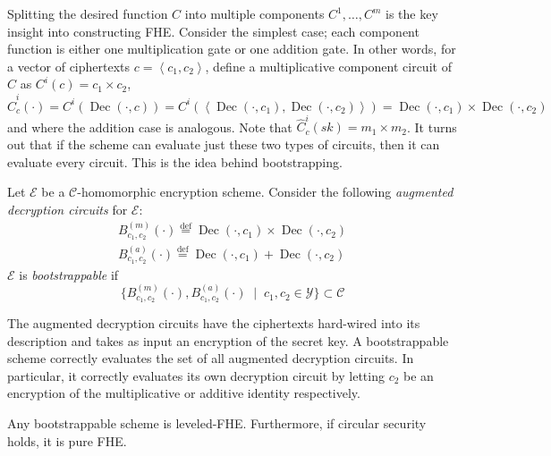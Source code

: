 Splitting the desired function $C$ into multiple components $C^1, \dots, C^m$ is the key insight into constructing FHE. Consider the simplest case; each component function is either one multiplication gate or one addition gate. In other words, for a vector of ciphertexts $c = \left\langle c_1, c_2 \right\rangle$, define a multiplicative component circuit of $C$ as $C^i(c) = c_1 \times c_2$, $\hat{C}^i_c(\cdot) = C^i(\operatorname{Dec}(\cdot, c)) = C^i(\left\langle \operatorname{Dec}(\cdot, c_1), \operatorname{Dec}(\cdot, c_2) \right\rangle) = \operatorname{Dec}(\cdot, c_1) \times \operatorname{Dec}(\cdot, c_2)$ and where the addition case is analogous. Note that $\hat{C}^i_c(sk) = m_1 \times m_2$. It turns out that if the scheme can evaluate just these two types of circuits, then it can evaluate every circuit. This is the idea behind bootstrapping.
\begin{definition}
    Let $\mathcal{E}$ be a $\mathcal{C}$-homomorphic encryption scheme. Consider the following \textit{augmented decryption circuits} for $\mathcal{E}$:
    \begin{equation*}
    \begin{aligned}        
        B_{c_1,c_2}^{(m)}(\cdot) \stackrel{\mathrm{def}}{=} \operatorname{Dec}(\cdot, c_1) \times \operatorname{Dec}(\cdot, c_2)\\
        B_{c_1,c_2}^{(a)}(\cdot) \stackrel{\mathrm{def}}{=} \operatorname{Dec}(\cdot, c_1) + \operatorname{Dec}(\cdot, c_2)
    \end{aligned}
    \end{equation*}
    $\mathcal{E}$ is \textit{bootstrappable} if
    \begin{equation*}
    \{B_{c_1,c_2}^{(m)}(\cdot), B_{c_1,c_2}^{(a)}(\cdot) \; \mid \; c_1, c_2 \in \mathcal{Y}\} \subset \mathcal{C}
    \end{equation*}
\end{definition}
The augmented decryption circuits have the ciphertexts hard-wired into its description and takes as input an encryption of the secret key. A bootstrappable scheme correctly evaluates the set of all augmented decryption circuits. In particular, it correctly evaluates its own decryption circuit by letting $c_2$ be an encryption of the multiplicative or additive identity respectively.
\begin{theorem}
Any bootstrappable scheme is leveled-FHE. Furthermore, if circular security holds, it is pure FHE.
\end{theorem}
